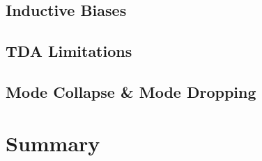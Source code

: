 \subsection{Inductive Biases}

\subsection{TDA Limitations}

\subsection{Mode Collapse \& Mode Dropping}

\section{Summary}
